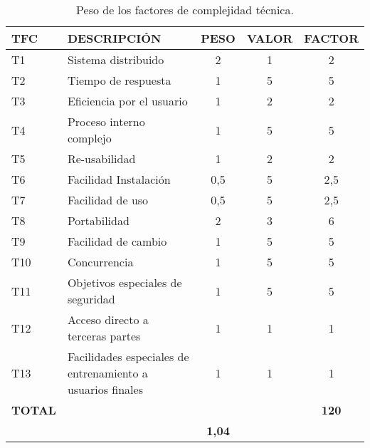 \begin{table}[!hb]
\begin{center}
\begin{tabular}{l l c c c}
\textbf{TFC} & \textbf{DESCRIPCIÓN} & \textbf{PESO} & \textbf{VALOR} & \textbf{FACTOR}\\ \hline \hline
T1	&	Sistema distribuido	&	2	&	1	&	2	\\
T2	&	Tiempo de respuesta	&	1	&	5	&	5	\\
T3	&	Eficiencia por el usuario	&	1	&	2	&	2	\\
T4	&	Proceso interno complejo	&	1	&	5	&	5	\\
T5	&	Re-usabilidad	&	1	&	2	&	2	\\
T6	&	Facilidad Instalación	&	0,5	&	5	&	2,5	\\
T7	&	Facilidad de uso	&	0,5	&	5	&	2,5	\\
T8	&	Portabilidad	&	2	&	3	&	6	\\
T9	&	Facilidad de cambio	&	1	&	5	&	5	\\
T10	&	Concurrencia	&	1	&	5	&	5	\\
T11	&	Objetivos especiales de seguridad	&	1	&	5	&	5	\\
T12	&	Acceso directo a terceras partes	&	1	&	1	&	1	\\
T13	&	Facilidades especiales de entrenamiento a usuarios finales	&	1	&	1	&	1	\\ \hline
\textbf{TOTAL} & & & & \textbf{120}\\ \hline \hline
\multicolumn{2}{l}{}\textbf{Factores técnicos} & \textbf{1,04} & & \\ \hline \hline
\end{tabular}
\caption{Peso de los factores de complejidad técnica.}
\label{tab:tcf}
\end{center}
\end{table}

